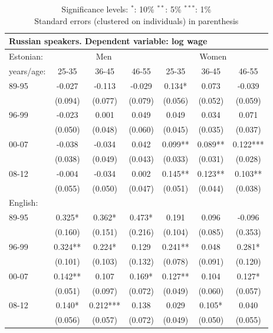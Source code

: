 \documentclass[12pt, a4paper]{article}
\def\tenpc{$^{\ast}$}
\def\fivepc{$^{\ast\ast}$}
\def\onepc{$^{\ast\ast\ast}$}
\newcommand{\legend}{\normalsize{Significance levels:\hspace{1em} \tenpc : 10\% \hspace{1em} \fivepc : 5\% \hspace{1em} \onepc : 1\% \normalsize}}
\begin{document}
\begin{table}[htbp]
\begin{tabular}{lccc|cc c}
          \midrule
		\multicolumn{7}{l}{Russian speakers. Dependent variable: log wage}\\
		\midrule
		Estonian:&\multicolumn{3}{c|}{Men} &\multicolumn{3}{c}{Women}\\
		years/age: & 25-35   & 36-45    & 46-55   & 25-35   & 36-45   & 46-55    \\
		\midrule
		89-95      & -0.027  & -0.113   & -0.029  & 0.134*  & 0.073   & -0.039   \\
		           & (0.094) & (0.077)  & (0.079) & (0.056) & (0.052) & (0.059)  \\
		96-99      & -0.023  & 0.001    & 0.049   & 0.049   & 0.034   & 0.071    \\
		           & (0.050) & (0.048)  & (0.060) & (0.045) & (0.035) & (0.037)  \\
		00-07      & -0.038  & -0.034   & 0.042   & 0.099** & 0.089** & 0.122*** \\
		           & (0.038) & (0.049)  & (0.043) & (0.033) & (0.031) & (0.028)  \\
		08-12      & -0.004  & -0.034   & 0.002   & 0.145** & 0.123** & 0.103**  \\
		           & (0.055) & (0.050)  & (0.047) & (0.051) & (0.044) & (0.038)  \\ \midrule
		English:   &         &          &         &         &         &          \\
		89-95      & 0.325*  & 0.362*   & 0.473*  & 0.191   & 0.096   & -0.096   \\
		           & (0.160) & (0.151)  & (0.216) & (0.104) & (0.085) & (0.353)  \\
		96-99      & 0.324** & 0.224*   & 0.129   & 0.241** & 0.048   & 0.281*   \\
		           & (0.101) & (0.103)  & (0.132) & (0.078) & (0.091) & (0.120)  \\
		00-07      & 0.142** & 0.107    & 0.169*  & 0.127** & 0.104   & 0.127*   \\
		           & (0.051) & (0.097)  & (0.072) & (0.049) & (0.060) & (0.057)  \\
		08-12      & 0.140*  & 0.212*** & 0.138   & 0.029   & 0.105*  & 0.040    \\
		           & (0.056) & (0.057)  & (0.072) & (0.049) & (0.050) & (0.055)  \\
		\bottomrule
	\end{tabular}

	\caption*{\legend \\ Standard errors (clustered on individuals) in parenthesis}
	\label{tab:age_group_trend}
\end{table}
\end{document}
